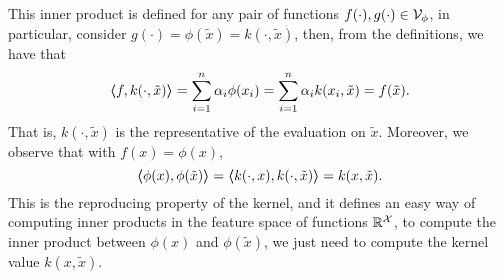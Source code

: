 %
This inner product is defined for any pair of functions $f(\cdot), g(\cdot) \in \mathcal{V}_\phi$, in particular, consider $g(\cdot) = \phi(\tilde{x}) = k(\cdot, \tilde{x})$, then, from the definitions, we have that
$$ \bm{\left\langle} f, k(\cdot, \tilde{x}) \bm{\right\rangle} = \sum_{i=1}^n \alpha_i \phi(x_i) =\sum_{i=1}^n \alpha_i k(x_i, \tilde{x}) = f(\tilde{x}) .$$
That is, $k(\cdot, \tilde{x})$ is the representative of the evaluation on $\tilde{x}$. Moreover, we observe that with $f(x) = \phi(x)$,
$$ \bm{\left\langle} \phi(x), \phi(\tilde{x}) \bm{\right\rangle} = \bm{\left\langle} k(\cdot, x), k(\cdot, \tilde{x}) \bm{\right\rangle} = k(x, \tilde{x}) .$$  
This is the reproducing property of the kernel, and it defines an easy way of computing inner products in the feature space of functions $\mathbb{R}^{\mathcal{X}}$, to compute the inner product between $\phi(x)$ and $\phi(\tilde{x})$, we just need to compute the kernel value $k(x, \tilde{x})$.

